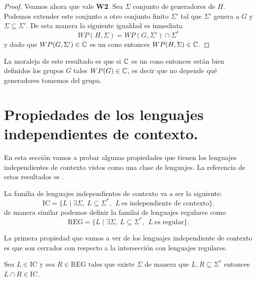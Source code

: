 \documentclass[tesis.tex]{subfiles}
\begin{document}
\begin{proof}
	Veamos ahora que vale \textbf{W2}. 
	Sea $\Sigma$ conjunto de generadores de $H$.
	Podemos extender este conjunto a otro conjunto finito $\Sigma'$ tal que $\Sigma'$ genera a $G$ y $\Sigma \subseteq \Sigma'$. 
	De esta manera la siguiente igualdad es inmediata
	\[
	WP(H, \Sigma) = WP(G, \Sigma') \cap \Sigma^*
	\]
	y dado que $WP(G, \Sigma') \in \mathbb{C}$ es un cono entonces $WP(H, \Sigma) \in \mathbb{C}$.
	
\end{proof}

La moraleja de este resultado es que si $\mathbb{C}$ es un cono entonces están bien definidos los grupos $G$ tales $WP(G) \in \mathbb{C}$, es decir que no depende qué generadores tomemos del grupo. 
 

\section{Propiedades de los lenguajes independientes de contexto.}

En esta sección vamos a probar algunas propiedades que tienen los lenguajes independientes de contexto vistos como una clase de lenguajes.
La referencia de estos resultados es \cite{hopcraft-ullman}.


La familia de lenguajes independientes de contexto va a ser la siguiente:
\[
	\text{IC} = \{  L \mid \exists \Sigma, \ L \subseteq \Sigma^*, \ \ L \  \text{es independiente de contexto} \}.
\]
de manera similar podemos definir la familai de lenguajes regulares como
\[
	\text{REG} = \{  L \mid \exists \Sigma, \ L \subseteq \Sigma^*, \ \ L \  \text{es regular}  \}.
\]

La primera propiedad que vamos a ver de los lenguajes independiente de contexto es que son cerrados con respecto a la intersección con lenguajes regulares.

\begin{prop}\label{intersecciones-reg-ic}
	Sea $L \in \text{IC}$ y sea $R \in \text{REG}$ tales que existe $\Sigma$ de manera que $L,R \subseteq \Sigma^{*}$ entonces $L \cap R \in \text{IC}$.	
\end{prop}
\end{document}
